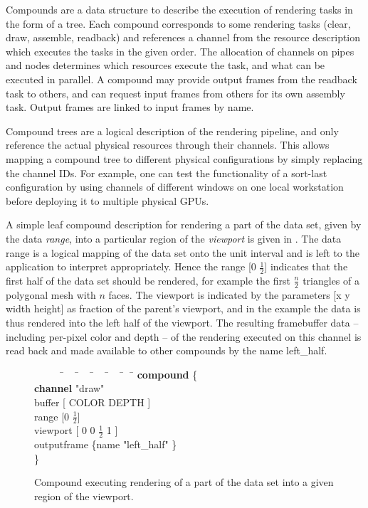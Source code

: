 Compounds are a data structure to describe the execution of rendering tasks in
the form of a tree. Each compound corresponds to some rendering tasks (clear,
draw, assemble, readback) and references a channel from the resource
description which executes the tasks in the given order. The allocation of
channels on pipes and nodes determines which resources execute the task, and
what can be executed in parallel. A compound may provide output frames from the
readback task to others, and can request input frames from others for its own
assembly task. Output frames are linked to input frames by name.

Compound trees are a logical description of the rendering pipeline, and only
reference the actual physical resources through their channels. This allows
mapping a compound tree to different physical configurations by simply replacing
the channel IDs. For example, one can test the functionality of a sort-last
configuration by using channels of different windows on one local workstation
before deploying it to multiple physical GPUs.

A simple leaf compound description for rendering a part of the data set, given
by the data {\em range}, into a particular region of the {\em viewport} is
given in . The data range is a logical mapping of the
data set onto the unit interval and is left to the application to interpret
appropriately. Hence the range [0 $\frac{1}{2}$] indicates that the first half
of the data set should be rendered, for example the first $\frac{n}{2}$
triangles of a polygonal mesh with $n$ faces. The viewport is indicated by the
parameters [x y width height] as fraction of the parent's viewport, and in the
example the data is thus rendered into the left half of the viewport. The
resulting framebuffer data -- including per-pixel color and depth -- of the
rendering executed on this channel is read back and made available to other
compounds by the name left\_half.

\begin{figure}[h!t]\center
 {\begin{tabbing} \ \ \ \ \ \=\ \ \ \=\ \ \ \=\ \ \ \=\ \ \ \=\ \ \ \= \kill
   \> {\bf compound} \{						\\
   \>\> {\bf channel} "draw"					\\
   \>\> buffer  [ COLOR DEPTH ]				\\
   \>\> range [0 $\frac{1}{2}$]				\\
   \>\> viewport [ 0 0 $\frac{1}{2}$ 1 ]                 \\
   \>\> outputframe \{name "left\_half" \}	\\
   \> \}
  \end{tabbing}}
 \vspace{-2mm}
 \caption{Compound executing rendering of a part of the data set into a given region of the viewport.\label{FIG_leaf_compound}}
\end{figure}

